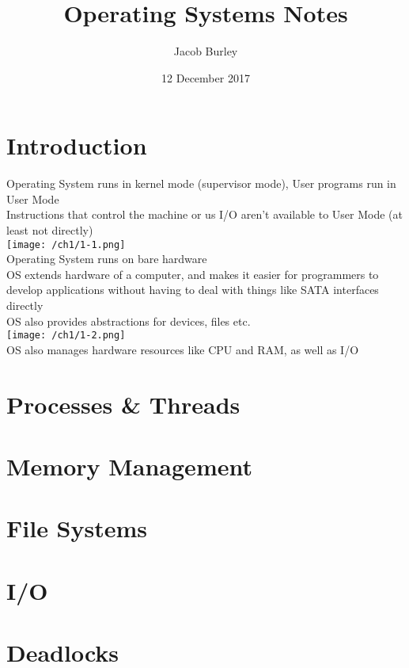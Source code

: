 \documentclass{article}
\title{Operating Systems Notes}
\author{Jacob Burley} %
\date{12 December 2017}
\begin{document}
\graphicspath{ {/tex/} }

\maketitle
\section{Introduction}
Operating System runs in kernel mode (supervisor mode), User programs run in User Mode
\\Instructions that control the machine or us I/O aren't available to User Mode (at least not directly)
\\\texttt{[image: /ch1/1-1.png]}
\\Operating System runs on bare hardware
\\OS extends hardware of a computer, and makes it easier for programmers to develop applications without having to deal with things like SATA interfaces directly
\\OS also provides abstractions for devices, files etc.
\\\texttt{[image: /ch1/1-2.png]}
\\OS also manages hardware resources like CPU and RAM, as well as I/O
\section{Processes & Threads}

\section{Memory Management}

\section{File Systems}

\section{I/O}

\section{Deadlocks}
\end{document}
